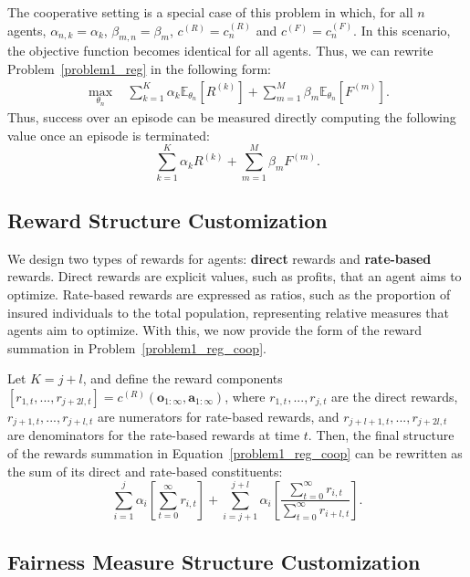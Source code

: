 The cooperative setting is a special case of this problem in which, for all $n$ agents, $\alpha_{n,k}=\alpha_k$, $\beta_{m,n}=\beta_{m}$, $c^{(R)}=c^{(R)}_n$ and $c^{(F)}=c^{(F)}_n$. In this scenario, the objective function becomes identical for all agents. Thus, we can rewrite Problem~\ref{problem1_reg} in the following form:
\begin{align}
    \label{problem1_reg_coop}
    \max_{\theta_n} \ \ \ \ \sum_{k=1}^{K}
    \alpha_{k}\mathbb{E}_{\theta_n}[R^{(k)}] + \sum_{m=1}^{M}\beta_{m} \mathbb{E}_{\theta_n}[F^{(m)}].
\end{align}
Thus, success over an episode can be measured directly computing the following value once an episode is terminated:
\begin{equation}
    \label{eq::episode_success}
    \sum_{k=1}^{K}
    \alpha_{k}R^{(k)} + \sum_{m=1}^{M}\beta_{m} F^{(m)}.
\end{equation}

\subsection{Reward Structure Customization}
\label{sec::reward_struct}

We design two types of rewards for agents: \textbf{direct} rewards and \textbf{rate-based} rewards. Direct rewards are explicit values, such as profits, that an agent aims to optimize. Rate-based rewards are expressed as ratios, such as the proportion of insured individuals to the total population, representing relative measures that agents aim to optimize. With this, we now provide the form of the reward summation in Problem~\ref{problem1_reg_coop}.

Let $K=j+l$, and define the reward components $[r_{1,t},...,r_{j+2l,t}]=c^{(R)}(\mathbf{o}_{1:\infty},\mathbf{a}_{1:\infty})$, where $r_{1,t},...,r_{j,t}$ are the direct rewards, $r_{j+1,t},...,r_{j+l,t}$ are numerators for rate-based rewards, and $r_{j+l+1,t},...,r_{j+2l,t}$ are denominators for the rate-based rewards at time $t$. Then, the final structure of the rewards summation in Equation~\ref{problem1_reg_coop} can be rewritten as the sum of its direct and rate-based constituents:
\begin{equation}
    \sum_{i=1}^{j}\alpha_i\left[\sum_{t=0}^{\infty} r_{i,t}\right] + \sum_{i=j+1}^{j+l}\alpha_i \left[\frac{\sum_{t=0}^{\infty}r_{i,t}}{\sum_{t=0}^{\infty}r_{i+l,t}}\right].
\end{equation}

\subsection{Fairness Measure Structure Customization}
\label{sec::fair_struct}

